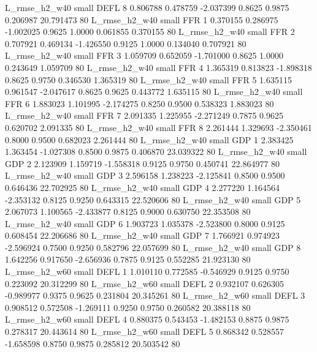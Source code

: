  L_rmse_h2_w40      small     DEFL                 8 0.806788 0.478759 -2.037399 0.8625 0.9875  0.206987   20.791473 80
 L_rmse_h2_w40      small      FFR                 1 0.370155 0.286975 -1.002025 0.9625 1.0000  0.061855    0.370155 80
 L_rmse_h2_w40      small      FFR                 2 0.707921 0.469134 -1.426550 0.9125 1.0000  0.134040    0.707921 80
 L_rmse_h2_w40      small      FFR                 3 1.059709 0.652059 -1.701000 0.8625 1.0000  0.243649    1.059709 80
 L_rmse_h2_w40      small      FFR                 4 1.365319 0.813823 -1.898318 0.8625 0.9750  0.346530    1.365319 80
 L_rmse_h2_w40      small      FFR                 5 1.635115 0.961547 -2.047617 0.8625 0.9625  0.443772    1.635115 80
 L_rmse_h2_w40      small      FFR                 6 1.883023 1.101995 -2.174275 0.8250 0.9500  0.538323    1.883023 80
 L_rmse_h2_w40      small      FFR                 7 2.091335 1.225955 -2.271249 0.7875 0.9625  0.620702    2.091335 80
 L_rmse_h2_w40      small      FFR                 8 2.261444 1.329693 -2.350461 0.8000 0.9500  0.682023    2.261444 80
 L_rmse_h2_w40      small      GDP                 1 2.383425 1.363454 -1.027308 0.8500 0.9875  0.406870   23.039322 80
 L_rmse_h2_w40      small      GDP                 2 2.123909 1.159719 -1.558318 0.9125 0.9750  0.450741   22.864977 80
 L_rmse_h2_w40      small      GDP                 3 2.596158 1.238223 -2.125841 0.8500 0.9500  0.646436   22.702925 80
 L_rmse_h2_w40      small      GDP                 4 2.277220 1.164564 -2.353132 0.8125 0.9250  0.643315   22.520606 80
 L_rmse_h2_w40      small      GDP                 5 2.067073 1.100565 -2.433877 0.8125 0.9000  0.630750   22.353508 80
 L_rmse_h2_w40      small      GDP                 6 1.903723 1.035378 -2.523800 0.8000 0.9125  0.608454   22.206686 80
 L_rmse_h2_w40      small      GDP                 7 1.766921 0.974923 -2.596924 0.7500 0.9250  0.582796   22.057699 80
 L_rmse_h2_w40      small      GDP                 8 1.642256 0.917650 -2.656936 0.7875 0.9125  0.552285   21.923130 80
 L_rmse_h2_w60      small     DEFL                 1 1.010110 0.772585 -0.546929 0.9125 0.9750  0.223092   20.312299 80
 L_rmse_h2_w60      small     DEFL                 2 0.932107 0.626305 -0.989977 0.9375 0.9625  0.231804   20.345261 80
 L_rmse_h2_w60      small     DEFL                 3 0.908512 0.572508 -1.269111 0.9250 0.9750  0.260582   20.388118 80
 L_rmse_h2_w60      small     DEFL                 4 0.880375 0.543453 -1.482153 0.8875 0.9875  0.278317   20.443614 80
 L_rmse_h2_w60      small     DEFL                 5 0.868342 0.528557 -1.658598 0.8750 0.9875  0.285812   20.503542 80
